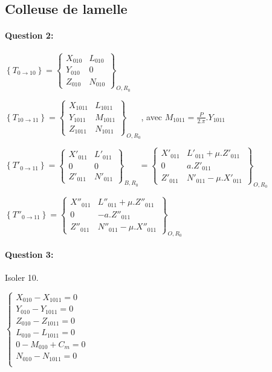 \subsection{Colleuse de lamelle}

\paragraph{Question 2:} 

$\left\{T_{0\rightarrow 10}\right\}=\left\{
\begin{array}{cc}
X_{010} & L_{010} \\
Y_{010} & 0 \\
Z_{010} & N_{010}
\end{array}
\right\}_{O,R_0}$

$\left\{T_{10\rightarrow 11}\right\}=\left\{
\begin{array}{cc}
X_{1011} & L_{1011} \\
Y_{1011} & M_{1011} \\
Z_{1011} & N_{1011}
\end{array}
\right\}_{O,R_0}$, avec $M_{1011}=\frac{P}{2.\pi}.Y_{1011}$

$\left\{T'_{0\rightarrow 11}\right\}=\left\{
\begin{array}{cc}
X'_{011} & L'_{011} \\
0 & 0 \\
Z'_{011} & N'_{011}
\end{array}
\right\}_{B,R_0}=\left\{
\begin{array}{cc}
X'_{011} & L'_{011}+\mu.Z'_{011} \\
0 & a.Z'_{011} \\
Z'_{011} & N'_{011}-\mu.X'_{011}
\end{array}
\right\}_{O,R_0}$

$\left\{T''_{0\rightarrow 11}\right\}=\left\{
\begin{array}{cc}
X''_{011} & L''_{011}+\mu.Z''_{011} \\
0 & -a.Z''_{011} \\
Z''_{011} & N''_{011}-\mu.X''_{011}
\end{array}
\right\}_{O,R_0}$


\paragraph{Question 3:}

Isoler 10.

$\left\{\begin{array}{l}
X_{010}-X_{1011}=0 \\
Y_{010}-Y_{1011}=0 \\
Z_{010}-Z_{1011}=0 \\
L_{010}-L_{1011}=0 \\
0-M_{010}+C_m=0  \\
N_{010}-N_{1011}=0 \\
\end{array}\right.$

